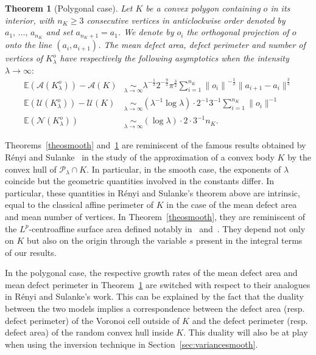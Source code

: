 \documentclass[10pt]{amsart}
\newtheorem{theo}{Theorem}[section]
\theoremstyle{definition}\newtheorem{defi}[theo]{Definition}\newtheorem{rema}[theo]{Remark}\newtheorem{exam}[theo]{Example}\newtheorem{exem}[theo]{Example}\newtheorem{nota}[theo]{Notation}
\newcommand{\cA}{\mathcal{A}}
\newcommand{\cN}{\mathcal{N}}
\newcommand{\cP}{\mathcal{P}}
\newcommand{\cU}{\mathcal{U}}
\newcommand{\E}{\mathbb{E}}
\newcommand{\pass}{\vspace{0.3cm}\noindent}
\begin{document}


\begin{theo}[Polygonal case]\label{theopolygon}
Let $K$ be a convex polygon containing $o$ in its interior, with $n_K\ge 3$ consecutive vertices in anticlockwise order denoted by $a_1,\,\ldots,\,a_{n_K}$ and set $a_{n_K+1}=a_1$. We denote by $o_i$ the orthogonal projection of $o$ onto the line $(a_i,a_{i+1})$. The mean defect area, defect perimeter and number of vertices of $K_{\lambda}^o$ have respectively the following asymptotics when the intensity $\lambda\to\infty:$
\begin{align}
\tag{$\rm i$}\label{theo1.2.i} \E(\cA(K_{\lambda}^o))-\cA(K) &\underset{\lambda\to\infty}{\sim}
 \lambda^{-\frac1{2}}2^{-\frac{9}{2}}\pi^{\frac{3}{2}} \sum_{i=1}^{n_K} {\|o_i\|}^{-\frac1{2}}\|a_{i+1}-a_i\|^{\frac{3}{2}}\\
\tag{$\rm ii$}\label{theo1.2.ii} \E(\cU(K_{\lambda}^o))-\cU(K) &\underset{\lambda\to\infty}{\sim} \left(\lambda^{-1}\log \lambda\right)\cdot 2^{-1} 3^{-1}\sum_{i=1}^{n_K} \|o_i\|^{-1}\\
\tag{$\rm iii$}\label{theo1.2.iii} \E(\cN(K_{\lambda}^o)) &\underset{\lambda\to\infty}{\sim}(\log\lambda)\cdot 2\cdot 3^{-1}n_K.
\end{align}
\end{theo}


Theorems~\ref{theosmooth} and~\ref{theopolygon} are reminiscent of the famous results obtained by R\'enyi and Sulanke~\cite{resu63,resu64} in the study of the approximation of a convex body $K$ by the convex hull of $\cP_\lambda\cap K$. In particular, in the smooth case, the exponents of $\lambda$ coincide but the geometric quantities involved in the constants differ. In particular, these quantities in R\'enyi and Sulanke's theorem above are intrinsic, equal to the classical affine perimeter of $K$ in the case of the mean defect area and mean number of vertices. In Theorem~\ref{theosmooth}, they are reminiscent of the $L^p$-centroaffine surface area defined notably in~\cite{Hug96} and~\cite{Lut96}. They depend not only on $K$ but also on the origin through the variable $s$ present in the integral terms of our results.

In the polygonal case, the respective growth rates of the mean defect area and mean defect perimeter in Theorem~\ref{theopolygon} are switched with respect to their analogues in R\'enyi and Sulanke's work. This can be explained by the fact that the duality between the two models implies a correspondence between the defect area (resp. defect perimeter) of the Voronoi cell outside of $K$ and the defect perimeter (resp. defect area) of the random convex hull inside $K$. This duality will also be at play when using the inversion technique in Section~\ref{sec:variancesmooth}.
\end{document}

